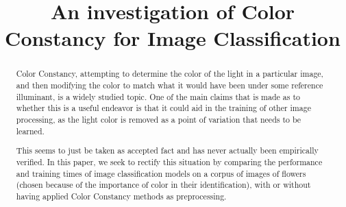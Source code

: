 \documentclass{bmvc2k}
\title{An investigation of Color Constancy for Image Classification}
\begin{document}
\maketitle

\begin{abstract}
Color Constancy, attempting to determine the color of the light in a particular image, and then 
modifying the color to match what it would have been under some reference illuminant, is a widely studied topic.
One of the main claims that is made as to whether this is a useful endeavor is that it could aid in the training
of other image processing, as the light color is removed as a point of variation that needs to be learned.

This seems to just be taken as accepted fact and has never actually been empirically verified. In this paper, we
seek to rectify this situation by comparing the performance and training times of image classification models on 
a corpus of images of flowers (chosen because of the importance of color in their identification), with or without
having applied Color Constancy methods as preprocessing.
\end{abstract}


\end{document}
